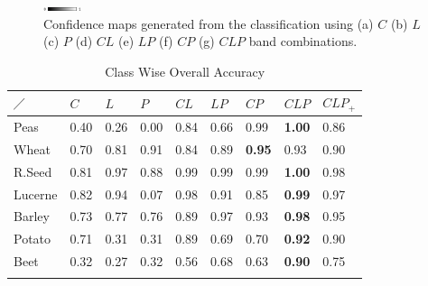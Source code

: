 \begin{figure}[tp]
\begin{subfigure}[b]{0.3\textwidth}
                \caption{}
                \label{fig:CLPconf}
            \end{subfigure}
          
            \includegraphics[width=0.1\textwidth]{Figures/Kron/Conf/grad}
    \caption{Confidence maps generated from the classification using (a) $C$ (b) $L$ (c) $P$ (d) $CL$ (e) $LP$ (f) $CP$ (g) $CLP$ band combinations.}\label{fig:Conf}
\end{figure}


\begin{table}[tbp]
	\centering
	\caption{Class Wise Overall Accuracy}
	\label{tab:class}
	\begin{tabularx}{\columnwidth}{XXXXXXXXX}
		\hline \noalign{\vskip 0.5mm} 
		$\diagup$ & $C$    & $L$    & $P$    & $CL$   & $LP$   & $CP$   & $CLP$ & $CLP_+$  \\ \hline \noalign{\vskip 0.3mm}
		Peas     & 0.40 & 0.26 & 0.00 & 0.84 & 0.66 & 0.99 & \textbf{1.00} & 0.86\\
		Wheat    & 0.70 & 0.81 & 0.91 & 0.84 & 0.89 & \textbf{0.95} & 0.93 & 0.90\\
		R.Seed & 0.81 & 0.97 & 0.88 & 0.99 & 0.99 & 0.99 & \textbf{1.00} & 0.98\\
		Lucerne  & 0.82 & 0.94 & 0.07 & 0.98 & 0.91 & 0.85 & \textbf{0.99} & 0.97\\
		Barley   & 0.73 & 0.77 & 0.76 & 0.89 & 0.97 & 0.93 & \textbf{0.98} & 0.95\\
		Potato   & 0.71 & 0.31 & 0.31 & 0.89 & 0.69 & 0.70 & \textbf{0.92} & 0.90\\
		Beet     & 0.32 & 0.27 & 0.32 & 0.56 & 0.68 & 0.63 & \textbf{0.90} & 0.75\\ \hline  \noalign{\vskip 1mm} 
	\end{tabularx}
\end{table}


